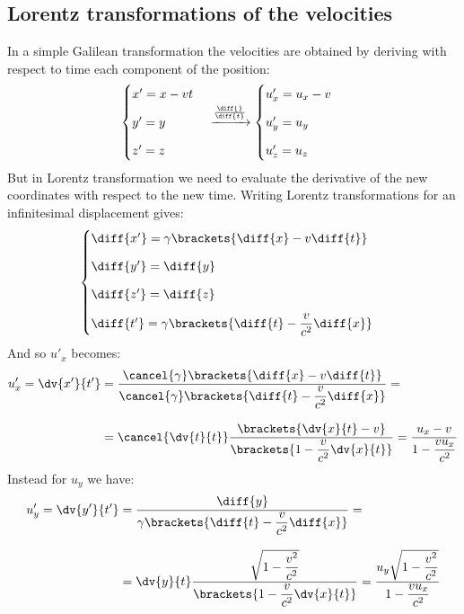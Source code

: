 \subsection{Lorentz transformations of the velocities}
In a simple Galilean transformation the velocities are obtained by deriving with respect to time each component of the position:
\begin{equation}
  \begin{cases}
    x' = x - vt \\[8pt]
    y' = y \\[8pt]
    z' = z
  \end{cases} \xrightarrow{\frac{\diff{}}{\diff{t}}}
  \begin{cases}
    u'_x = u_x - v \\[8pt]
    u'_y = u_y \\[8pt]
    u'_z = u_z
  \end{cases}
\end{equation}
But in Lorentz transformation we need to evaluate the derivative of the new coordinates with respect to the new time. Writing Lorentz transformations for an infinitesimal displacement gives:
\begin{equation}
  \begin{cases}
    \diff{x'} = \gamma \brackets{\diff{x} - v \diff{t}} \\[8pt]
    \diff{y'} = \diff{y} \\[8pt]
    \diff{z'} = \diff{z} \\[8pt]
    \diff{t'} = \gamma \brackets{\diff{t} - \dfrac{v}{c^2} \diff{x}}
  \end{cases}
\end{equation}
And so $u'_x$ becomes:
\begin{equation}
  \begin{split}
    u'_x = \dv{x'}{t'} &= \dfrac{\cancel{\gamma} \brackets{\diff{x} - v \diff{t}}}{\cancel{\gamma} \brackets{\diff{t} - \dfrac{v}{c^2} \diff{x}}} =\\[8pt]
    &= \cancel{\dv{t}{t}}\dfrac{\brackets{\dv{x}{t} - v}}{\brackets{1 - \dfrac{v}{c^2} \dv{x}{t}}} = \dfrac{u_x - v}{1 - \dfrac{v u_x}{c^2} }
  \end{split}
\end{equation}
Instead for $u_y$ we have:
\begin{equation}
  \begin{split}
    u'_y = \dv{y'}{t'} &= \dfrac{\diff{y}}{\gamma \brackets{\diff{t} - \dfrac{v}{c^2} \diff{x}}} =\\[8pt]
  &= \dv{y}{t}\dfrac{\sqrt{1-\dfrac{v^2}{c^2}}}{\brackets{1 - \dfrac{v}{c^2} \dv{x}{t}}} = \dfrac{u_y\sqrt{1-\dfrac{v^2}{c^2}}}{1 - \dfrac{v u_x}{c^2}}
  \end{split}
\end{equation}

